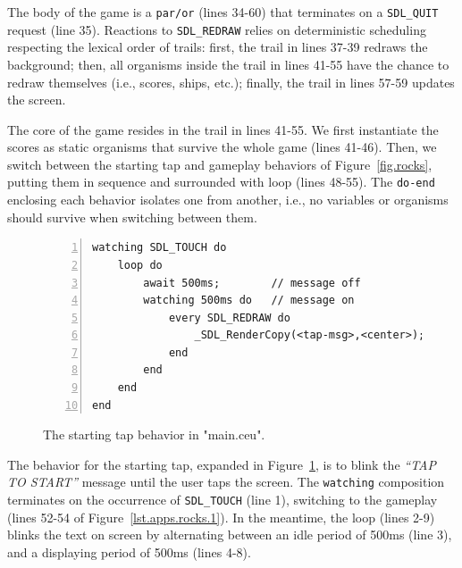 \documentclass{sigplanconf}
\newcommand{\code}[1] {{\small{\texttt{#1}}}}
\newcommand{\1}{\;}
\newcommand{\2}{\;\;}
\newcommand{\3}{\;\;\;}
\newcommand{\5}{\;\;\;\;\;}
\begin{document}
The body of the game is a \code{par/or} (lines 34-60) that terminates on a
\code{SDL\_QUIT} request (line 35).
%
Reactions to \code{SDL\_REDRAW} relies on deterministic scheduling respecting 
the lexical order of trails: first, the trail in lines 37-39 redraws the 
background; then, all organisms inside the trail in lines 41-55 have the chance 
to redraw themselves (i.e., scores, ships, etc.); finally, the trail in lines 
57-59 updates the screen.

The core of the game resides in the trail in lines 41-55.
We first instantiate the scores as static organisms that survive the whole game 
(lines 41-46).
Then, we switch between the starting tap and gameplay behaviors of 
Figure~\ref{fig.rocks}, putting them in sequence and surrounded with loop 
(lines 48-55).
The \code{do-end} enclosing each behavior isolates one from another, i.e., no 
variables or organisms should survive when switching between them.

\begin{figure}%
\begin{lstlisting}[numbers=left,xleftmargin=3em]
watching SDL_TOUCH do
    loop do
        await 500ms;        // message off
        watching 500ms do   // message on
            every SDL_REDRAW do
                _SDL_RenderCopy(<tap-msg>,<center>);
            end
        end
    end
end
\end{lstlisting}
\caption{ The starting tap behavior in "main.ceu".
\label{lst.apps.rocks.2}
}
\end{figure}

The behavior for the starting tap, expanded in Figure~\ref{lst.apps.rocks.2}, 
is to blink the \emph{``TAP TO START''} message until the user taps the screen.
The \code{watching} composition terminates on the occurrence of 
\code{SDL\_TOUCH} (line 1), switching to the gameplay (lines 52-54 of 
Figure~\ref{lst.apps.rocks.1}).
In the meantime, the loop (lines 2-9) blinks the text on screen by alternating 
between an idle period of 500ms (line 3), and a displaying period of 500ms 
(lines 4-8).
\end{document}
